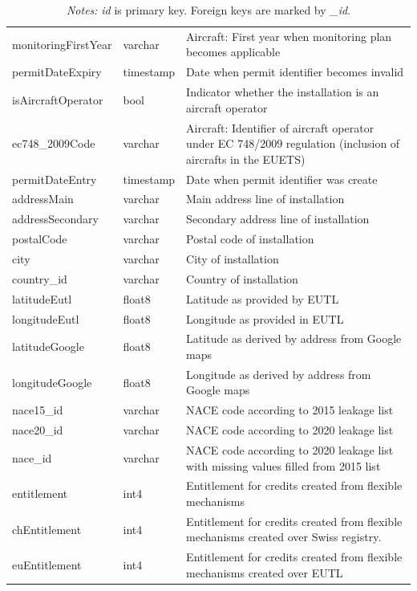 \documentclass[authoryear]{elsarticle}
\begin{document}
\begin{table}[tbp]
\begin{tabular*}{\textwidth}{@{}@{\extracolsep{\fill}} llp{8cm} @{}}
		monitoringFirstYear & varchar & Aircraft: First year when monitoring plan becomes applicable \\
		permitDateExpiry & timestamp & Date when permit identifier becomes invalid \\
		isAircraftOperator & bool  & Indicator whether the installation is an aircraft operator \\
		ec748\_2009Code & varchar & Aircraft: Identifier of aircraft operator under EC 748/2009 regulation (inclusion of aircrafts in the EUETS) \\
		permitDateEntry & timestamp & Date when permit identifier was create \\
		addressMain & varchar & Main address line of installation \\
		addressSecondary & varchar & Secondary address line of installation \\
		postalCode & varchar & Postal code of installation \\
		city  & varchar & City of installation \\
		country\_id & varchar & Country of installation \\
		latitudeEutl & float8 & Latitude as provided by EUTL \\
		longitudeEutl & float8 & Longitude as provided in EUTL \\
		latitudeGoogle & float8 & Latitude as derived by address from Google maps \\
		longitudeGoogle & float8 & Longitude as derived by address from Google maps \\
		nace15\_id & varchar & NACE code according to 2015 leakage list \\
		nace20\_id & varchar & NACE code according to 2020 leakage list \\
		nace\_id & varchar & NACE code according to 2020 leakage list with missing values filled from 2015 list \\
		entitlement & int4  & Entitlement for credits created from flexible mechanisms \\
		chEntitlement & int4  & Entitlement for credits created from flexible mechanisms created over Swiss registry. \\
		euEntitlement & int4  & Entitlement for credits created from flexible mechanisms created over EUTL\\
		\bottomrule
		\bottomrule
	\end{tabular*}%
	\vspace{-3ex}
\caption*{\footnotesize \emph{Notes:} \textit{id} is primary key. Foreign keys are marked by \textit{\_id}.}
\vspace{0ex}
\end{table}
\end{document}
